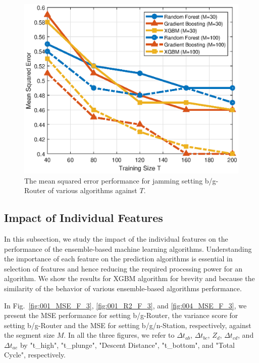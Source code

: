 		\begin{figure}[tbp]
	    \centering
		\includegraphics[width=0.9\columnwidth]{./chapter-ftml/plots/001_MSE_T.eps}
		\caption{The mean squared error performance for jamming setting b/g-Router of various algorithms against $T$.}
		\label{fig:001_MSE_T}      
	\end{figure}
	

\subsection{Impact of Individual Features}
In this subsection, we study the impact of the individual features on the performance of the ensemble-based machine learning algorithms. Understanding the importance of each feature on the prediction algorithms is essential in selection of features and hence reducing the required processing power for an algorithm. We show the results for XGBM algorithm for brevity and because the similarity of the behavior of various ensemble-based algorithms performance. 

In Fig.~\ref{fig:001_MSE_F_3}, \ref{fig:001_R2_F_3}, and \ref{fig:004_MSE_F_3}, we present the MSE performance for setting b/g-Router, the variance score for setting b/g-Router and the MSE for setting b/g/n-Station, respectively, against the segment size $M$. In all the three figures, we refer to $\Delta{t}_{ab}$, $\Delta{t}_{bc}$, $Z_d$, $\Delta{t}_{cd}$, and $\Delta{t}_{ae}$ by "t\_high", "t\_plunge", "Descent Distance", "t\_bottom", and "Total Cycle", respectively. 

